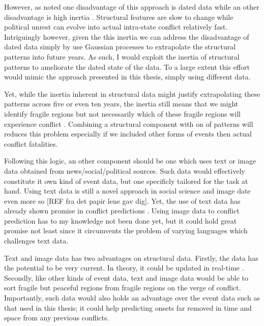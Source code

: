 \documentclass[a4paper]{article}
\begin{document}
However, as noted one disadvantage of this approach is dated data while an other disadvantage is high inertia \citep[10]{chadefaux2017conflict}. Structural features are slow to change while political unrest can evolve into actual intra-state conflict relatively fast. Intriguingly however, given the this inertia we can address the disadvantage of dated data simply by use Gaussian processes to extrapolate the structural patterns into future years. As such, I would exploit the inertia of structural patterns to ameliorate the dated state of the data. To a large extent this effort would mimic the approach presented in this thesis, simply using different data.\par

Yet, while the inertia inherent in structural data might justify extrapolating these patterns across five or even ten years, the inertia still means that we might identify fragile regions but not necessarily which of these fragile regions will experience conflict \citep[10]{chadefaux2017conflict}. Combining a structural component with on of patterns will reduces this problem especially if we included other forms of events then actual conflict fatalities.\par 

Following this logic, an other component should be one which uses text or image data obtained from news/social/political sources. Such data would effectively constitute it own kind of event data, but one specificly tailored for the task at hand. Using text data is still a novel approach in social science \citep{grimmer2013text} and image date even more so [REF fra det papir lene gav dig]. Yet, the use of text data has already shown promise in conflict predictions \citep{chadefaux_2014, mueller_2016}. Using image data to conflict prediction has to my knowledge not been done yet, but it could hold great promise not least since it circumvents the problem of varying languages which challenges text data. \par

Text and image data has two advantages on structural data. Firstly, the data has the potential to be very current. In theory, it could be updated in real-time \citep[474]{cederman2017predicting}. Secondly, like other kinds of event data, text and image data would be able to sort fragile but peaceful regions from fragile regions on the verge of conflict. Importantly, such data would also holds an advantage over the event data such as that used in this thesis; it could help predicting onsets far removed in time and space from any previous conflicts.\par
\end{document}
